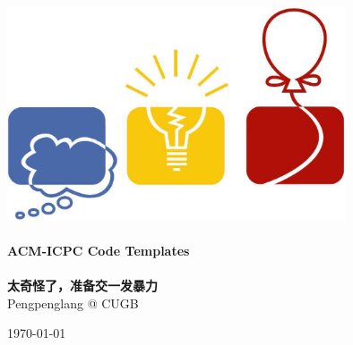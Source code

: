 \documentclass[14pt,a4paper]{article}
\begin{document}
\setlength{\baselineskip}{14pt}

\begin{titlepage}
    \begin{center}
        \vspace*{0.5cm}
        \includegraphics[width=0.75\textwidth]{logo.jpg} \\ [2cm]

        \HRule \\ [1cm]
        \textbf{\Huge{ACM-ICPC Code Templates}} \\ [0.5cm]
        \HRule \\ [4cm]

        \textbf{\Huge{太奇怪了，准备交一发暴力}} \\ [1cm]
        \LARGE{Pengpenglang @ CUGB}

        \vfill
        \Large{\today}
    \end{center}
    \clearpage

    \tableofcontents
    \pagestyle{empty}
    \clearpage
\end{titlepage}


\end{document}
